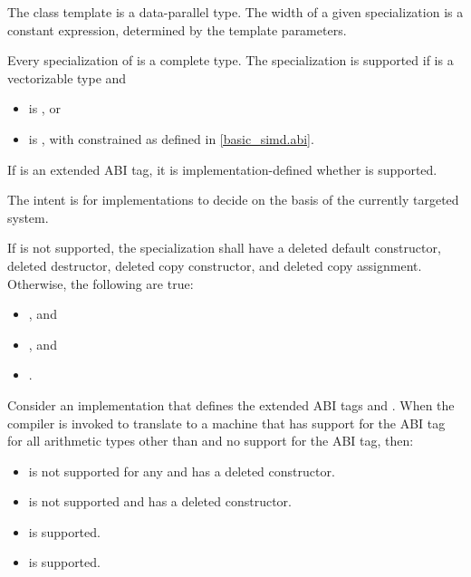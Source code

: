 \pnum
The class template  is a data-parallel type. The width of a given  specialization is a constant expression, determined by the template parameters.

\pnum
Every specialization of  is a complete type. The specialization  is supported if  is a vectorizable type and
\begin{itemize}
  \item {} is , or
  \item {} is , with  constrained as defined in \ref{basic_simd.abi}.
\end{itemize}

If  is an extended ABI tag, it is implementation-defined whether  is supported. \begin{note}The intent is for implementations to decide on the basis of the currently targeted system.\end{note}

If  is not supported, the specialization shall have a deleted default constructor, deleted destructor, deleted copy constructor, and deleted copy assignment.
Otherwise, the following are true:
\begin{itemize}
  \item {}, and
  \item {}, and
  \item {}.
\end{itemize}

\begin{example}
  Consider an implementation that defines the extended ABI tags  and . When the compiler is invoked to translate to a machine that has support for the  ABI tag for all arithmetic types other than  and no support for the  ABI tag, then:
  \begin{itemize}
    \item {} is not supported for any  and has a deleted constructor.
    \item {} is not supported and has a deleted constructor.
    \item {} is supported.
    \item {} is supported.
  \end{itemize}
\end{example}

